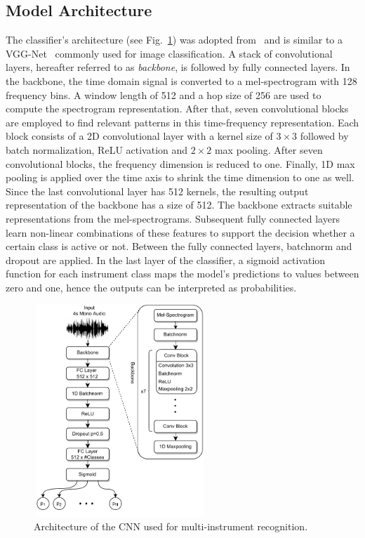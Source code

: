 \documentclass{article}
\begin{document}
\subsection{Model Architecture}
\label{sec:method:architecture}
The classifier's architecture (see Fig.~\ref{fig:architecture}) was adopted from~\cite{won2020evaluation} and is similar to a VGG-Net~\cite{simonyan2014very} commonly used for image classification. A stack of convolutional layers, hereafter referred to as \textit{backbone}, is followed by fully connected layers. In the backbone, the time domain signal is converted to a mel-spectrogram with 128 frequency bins. A window length of 512 and a hop size of 256 are used to compute the spectrogram representation. After that, seven convolutional blocks are employed to find relevant patterns in this time-frequency representation. Each block consists of a 2D convolutional layer with a kernel size of $3\times3$ followed by batch normalization, ReLU activation and $2\times2$ max pooling. After seven convolutional blocks, the frequency dimension is reduced to one. Finally, 1D max pooling is applied over the time axis to shrink the time dimension to one as well. Since the last convolutional layer has 512 kernels, the resulting output representation of the backbone has a size of 512. The backbone extracts suitable representations from the mel-spectrograms. Subsequent fully connected layers learn non-linear combinations of these features to support the decision whether a certain class is active or not. Between the fully connected layers, batchnorm and dropout are applied. In the last layer of the classifier, a sigmoid activation function for each instrument class maps the model's predictions to values between zero and one, hence the outputs can be interpreted as probabilities.
\begin{figure}[t]
	\begin{minipage}[b]{1.0\linewidth}
		\centering
		\centerline{\includegraphics[width=6.5cm,height=8.0cm]{cnn_architecture_paperversion.pdf}}
	\end{minipage}
	\centering
	\vspace*{-0.6cm}
	\caption{Architecture of the CNN used for multi-instrument recognition.}
	\label{fig:architecture}
	\vspace*{-0.05cm}	
\end{figure}
\end{document}
